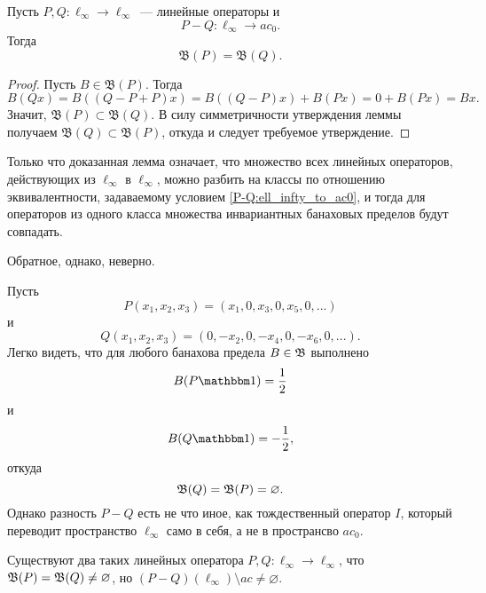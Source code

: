 \begin{lemma}
	\label{thm:linear_op_equiv_ac0}
	Пусть $P,Q:\ell_\infty \to \ell_\infty$~--- линейные операторы и
	\begin{equation}\label{P-Q:ell_infty_to_ac0}
		P-Q : \ell_\infty \to ac_0
		.
	\end{equation}
	Тогда
	\begin{equation}
		\mathfrak{B}(P)=\mathfrak{B}(Q)
		.
	\end{equation}
\end{lemma}

\begin{proof}
	Пусть $B\in \mathfrak{B}(P)$.
	Тогда
	\begin{equation}
		B(Qx) = B((Q-P+P)x) =
		B((Q-P)x)+B(Px) =
		0 + B(Px) =
		Bx
		.
	\end{equation}
	Значит, $\mathfrak{B}(P) \subset \mathfrak{B}(Q)$.
	В силу симметричности утверждения леммы получаем $\mathfrak{B}(Q) \subset \mathfrak{B}(P)$,
	откуда и следует требуемое утверждение.
\end{proof}

Только что доказанная лемма означает, что множество всех линейных операторов,
действующих из $\ell_\infty$ в $\ell_\infty$, можно разбить на классы по отношению эквивалентности,
задаваемому условием \eqref{P-Q:ell_infty_to_ac0},
и тогда для операторов из одного класса множества инвариантных банаховых пределов будут совпадать.

Обратное, однако, неверно.

\begin{example}
	Пусть
	\begin{equation}
		P(x_1,x_2,x_3) = (x_1, 0, x_3, 0, x_5, 0, ...)
	\end{equation}
	и
	\begin{equation}
		Q(x_1,x_2,x_3) = (0, -x_2, 0, -x_4, 0, -x_6, 0, ...)
		.
	\end{equation}
	Легко видеть, что для любого банахова предела $B\in\mathfrak{B}$ выполнено
	\begin{equation}
		B(P\one) = \frac{1}{2}
	\end{equation}
	и
	\begin{equation}
		B(Q\one) = -\frac{1}{2}
		,
	\end{equation}
	откуда
	\begin{equation}
		\mathfrak{B}(Q) = \mathfrak{B}(P) = \varnothing
		.
	\end{equation}
	Однако разность $P-Q$ есть не что иное, как тождественный оператор $I$,
	который переводит пространство $\ell_\infty$ само в себя,
	а не в пространсво $ac_0$.
\end{example}


\begin{hypothesis}
	Существуют два таких линейных оператора $P, Q : \ell_\infty \to \ell_\infty$,
	что $\mathfrak{B}(P) = \mathfrak{B}(Q) \neq \varnothing$,
	но $(P-Q)(\ell_\infty) \setminus ac \neq \varnothing$.
\end{hypothesis}

